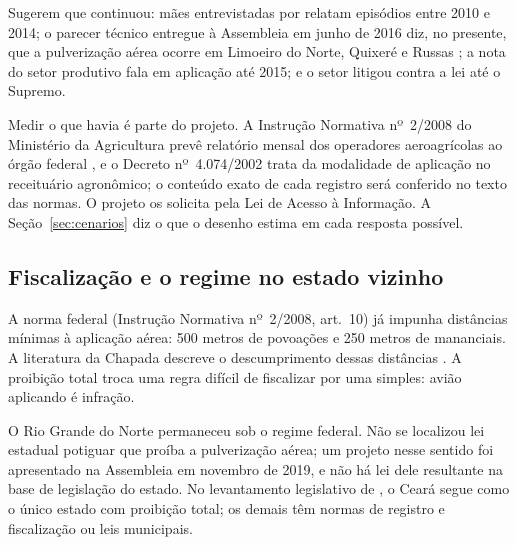 Sugerem que continuou: mães entrevistadas por  relatam episódios entre 2010 e 2014; o parecer técnico
entregue à Assembleia em junho de 2016 diz, no presente, que a pulverização
aérea ocorre em Limoeiro do Norte, Quixeré e Russas \cite{tramas2016parecer};
a nota do setor produtivo fala em aplicação até 2015; e o setor litigou contra
a lei até o Supremo.

Medir o que havia é parte do projeto. A Instrução Normativa nº~2/2008 do
Ministério da Agricultura prevê relatório mensal dos operadores aeroagrícolas
ao órgão federal \cite{olivete2025}, e o Decreto nº~4.074/2002 trata da
modalidade de aplicação no receituário agronômico; o conteúdo exato de cada
registro será conferido no texto das normas. O projeto os solicita pela Lei de
Acesso à Informação. A Seção~\ref{sec:cenarios}
diz o que o desenho estima em cada resposta possível.

\subsection{Fiscalização e o regime no estado vizinho}

A norma federal (Instrução Normativa nº~2/2008, art.~10) já impunha distâncias
mínimas à aplicação aérea: 500 metros de povoações e 250 metros de mananciais. A literatura da Chapada descreve o
descumprimento dessas distâncias \cite{teixeira2011rebulico,
tramas2016parecer}. A proibição total troca uma regra difícil de fiscalizar por
uma simples: avião aplicando é infração.

O Rio Grande do Norte permaneceu sob o regime federal. Não se localizou lei
estadual potiguar que proíba a pulverização aérea; um projeto nesse sentido foi
apresentado na Assembleia em novembro de 2019, e não há lei dele resultante na
base de legislação do estado. No
levantamento legislativo de , o Ceará segue como o único
estado com proibição total; os demais têm normas de registro e fiscalização ou
leis municipais.
